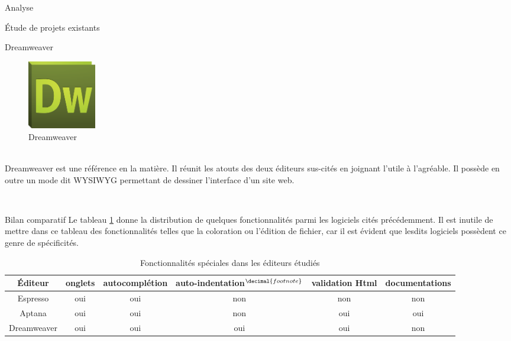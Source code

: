 \documentclass[a4paper, 12pt]{report}
\begin{document}
\begin{part}{Analyse}
\begin{chapter}{Étude de projets existants}
\begin{section}{Dreamweaver}
				\begin{figure}[h]
					\begin{center}
						\includegraphics[width=3cm]{images/logoDreamweaver.png}
						\caption{Dreamweaver}
					\end{center}
				\end{figure}~\\
				Dreamweaver est une référence en la matière. Il réunit les atouts des deux éditeurs sus-cités en joignant l'utile à l'agréable.
				Il possède en outre un mode dit \gls{WYSIWYG} permettant de dessiner l'interface d'un site web.
			\end{section}
			~\\


			\begin{section}{Bilan comparatif}
				Le tableau \ref{comparatif} donne la distribution de quelques fonctionnalités parmi les logiciels cités précédemment. Il est
				inutile de mettre dans ce tableau des fonctionnalités telles que la coloration ou l'édition de fichier, car il est évident que
				lesdits logiciels possèdent ce genre de spécificités.\\

				\addtocounter{footnote}{1}
				\begin{table}[h]
				\caption{\label{comparatif} Fonctionnalités spéciales dans les éditeurs étudiés}
					\begin{tabular}{|c||c|c|c|c|c|} %
					  \hline
					  Éditeur & onglets & autocomplétion & auto-indentation$^{\decimal{footnote}}$ & validation \gls{Html} & documentations \\
					  \hline

					  Espresso & oui & oui & non & non & non \\
					  Aptana & oui & oui & non & oui & oui \\
					  Dreamweaver & oui & oui & oui & oui & non \\
					  \hline
					\end{tabular}
				\end{table}


\end{section}
\end{chapter}
\end{part}
\end{document}
